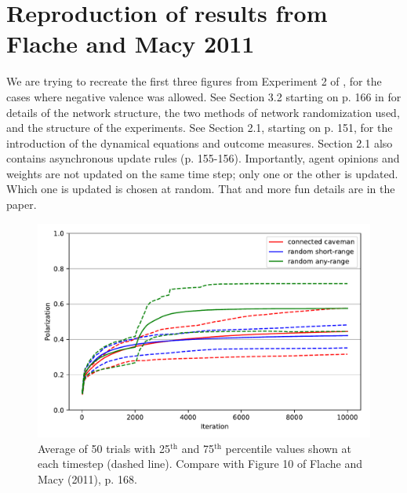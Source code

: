 \documentclass[11pt,letterpaper]{article}
\begin{document}
\section{Reproduction of results from Flache and Macy 2011}
\label{sec:label}

We are trying to recreate the first three figures from Experiment 2 of 
, for the cases where negative valence was allowed.
See Section 3.2 starting on p. 166 in  for details of the
network structure, the two methods of network randomization used, and 
the structure of the experiments. See Section 2.1, starting on p. 151, for 
the introduction of the dynamical equations and outcome measures. Section 2.1
also contains asynchronous update rules (p. 155-156). Importantly, agent opinions
and weights are not updated on the same time step; only one or the other is
updated. Which one is updated is chosen at random. That and more fun details
are in the paper.

\begin{figure}
\begin{center}
  \includegraphics[width=\textwidth]{Figures/figure10b.pdf}
\end{center}
  \caption{Average of 50 trials with 25$^{\mathrm{th}}$ and 75$^{\mathrm{th}}$ 
    percentile values shown at each timestep (dashed line). Compare with
    Figure 10 of Flache and Macy (2011), p. 168.}
\label{fig:figure10-reproduction}
\end{figure}
\end{document}
